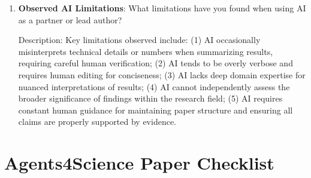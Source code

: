 \documentclass{article}
\begin{document}
\begin{enumerate}
    Answer: \involvementC{} %

    Explanation: The paper writing process involved significant AI assistance in drafting sections, improving prose quality, organizing content, and ensuring academic writing standards. However, human researchers provided the core content, scientific insights, result interpretations, and overall narrative structure. AI helped transform technical findings into coherent academic prose.

    \item \textbf{Observed AI Limitations}: What limitations have you found when using AI as a partner or lead author?

    Description: Key limitations observed include: (1) AI occasionally misinterprets technical details or numbers when summarizing results, requiring careful human verification; (2) AI tends to be overly verbose and requires human editing for conciseness; (3) AI lacks deep domain expertise for nuanced interpretations of results; (4) AI cannot independently assess the broader significance of findings within the research field; (5) AI requires constant human guidance for maintaining paper structure and ensuring all claims are properly supported by evidence.
\end{enumerate}

\newpage

\section*{Agents4Science Paper Checklist}
\end{document}
